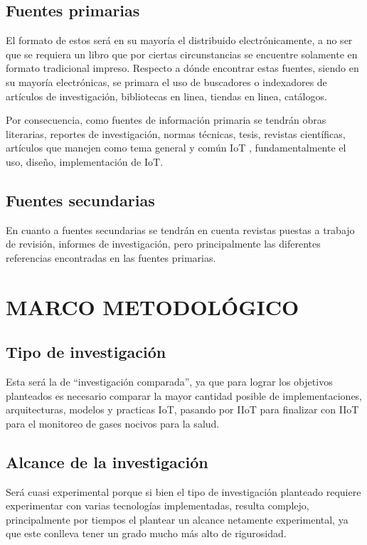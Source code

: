 \documentclass[stu,12pt,floatsintext]{apa7}
\begin{document}
	\subsection{Fuentes primarias}
	El formato de estos será en su mayoría el distribuido electrónicamente, a no ser que se requiera un libro que por ciertas circunstancias se encuentre solamente en formato tradicional impreso. Respecto a dónde encontrar estas fuentes, siendo en su mayoría electrónicas, se primara el uso de buscadores o indexadores de artículos de investigación, bibliotecas en linea, tiendas en linea, catálogos.
	
	Por consecuencia, como fuentes de información primaria se tendrán obras literarias, reportes de investigación, normas técnicas, tesis, revistas científicas,  artículos que manejen como tema general y común IoT , fundamentalmente el uso, diseño, implementación de IoT.
	\subsection{Fuentes secundarias}
	En cuanto a fuentes secundarias se tendrán en cuenta revistas puestas a trabajo de revisión, informes de investigación, pero principalmente las diferentes referencias encontradas en las fuentes primarias.
	\section{MARCO METODOLÓGICO}
	\subsection{Tipo de investigación}
	Esta será la de ``investigación comparada'', ya que para lograr los objetivos planteados es necesario comparar la mayor cantidad posible de implementaciones, arquitecturas, modelos y practicas IoT, pasando por IIoT para finalizar con IIoT para el monitoreo de gases nocivos para la salud.
	\subsection{Alcance de la investigación}
	Será cuasi experimental porque si bien el tipo de investigación planteado requiere experimentar con varias tecnologías implementadas, resulta complejo, principalmente por tiempos el plantear un alcance netamente experimental, ya que este conlleva tener un grado mucho más alto de rigurosidad.
\end{document}
